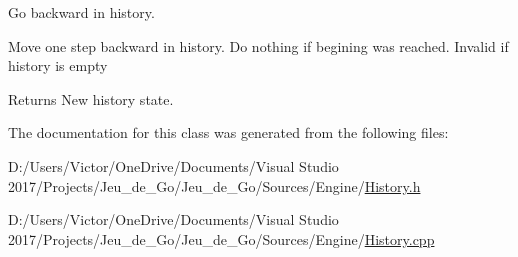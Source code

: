 Go backward in history. 

Move one step backward in history. Do nothing if begining was reached. Invalid if history is empty

\begin{DoxyReturn}{Returns}
New history state. 
\end{DoxyReturn}


The documentation for this class was generated from the following files\+:\begin{DoxyCompactItemize}
\item 
D\+:/\+Users/\+Victor/\+One\+Drive/\+Documents/\+Visual Studio 2017/\+Projects/\+Jeu\+\_\+de\+\_\+\+Go/\+Jeu\+\_\+de\+\_\+\+Go/\+Sources/\+Engine/\hyperlink{_history_8h}{History.\+h}\item 
D\+:/\+Users/\+Victor/\+One\+Drive/\+Documents/\+Visual Studio 2017/\+Projects/\+Jeu\+\_\+de\+\_\+\+Go/\+Jeu\+\_\+de\+\_\+\+Go/\+Sources/\+Engine/\hyperlink{_history_8cpp}{History.\+cpp}\end{DoxyCompactItemize}
